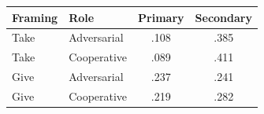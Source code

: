 \begingroup
\centering
\begin{tabular*}{\linewidth}{@{\extracolsep{\fill}}llcc}
   \toprule
   Framing & Role & Primary & Secondary\\
   \midrule
   Take & Adversarial & .108 & .385\\
   Take & Cooperative & .089 & .411\\
   Give & Adversarial & .237 & .241\\
   Give & Cooperative & .219 & .282\\
   \bottomrule
\end{tabular*}
\par\endgroup
